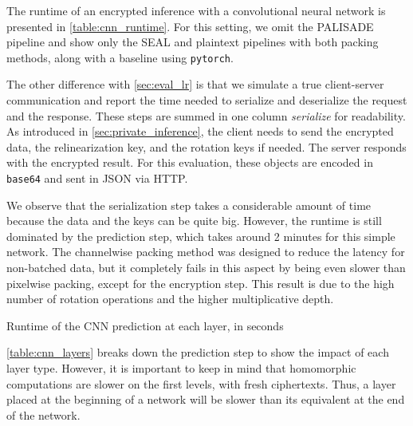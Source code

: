 \documentclass[a4paper,11pt,oneside]{report}
\begin{document}
The runtime of an encrypted inference with a convolutional neural network is presented in \autoref{table:cnn_runtime}. 
For this setting, we omit the PALISADE pipeline and show only the SEAL and plaintext pipelines with both packing methods, along with a baseline using \texttt{pytorch}.

The other difference with \autoref{sec:eval_lr} is that we simulate a true client-server communication and report the time needed to serialize and deserialize the request and the response.
These steps are summed in one column \emph{serialize} for readability.
As introduced in \autoref{sec:private_inference}, the client needs to send the encrypted data, the relinearization key, and the rotation keys if needed.
The server responds with the encrypted result.
For this evaluation, these objects are encoded in \texttt{base64} and sent in JSON via HTTP.

We observe that the serialization step takes a considerable amount of time because the data and the keys can be quite big. 
However, the runtime is still dominated by the prediction step, which takes around 2 minutes for this simple network.
The channelwise packing method was designed to reduce the latency for non-batched data, but it completely fails in this aspect by being even slower than pixelwise packing, except for the encryption step.
This result is due to the high number of rotation operations and the higher multiplicative depth.

\begin{table}[h!]
  \begin{center}
    \caption{Runtime of the CNN prediction at each layer, in seconds}
    \label{table:cnn_layers}
  \end{center}
\end{table}

\autoref{table:cnn_layers} breaks down the prediction step to show the impact of each layer type. 
However, it is important to keep in mind that homomorphic computations are slower on the first levels, with fresh ciphertexts. 
Thus, a layer placed at the beginning of a network will be slower than its equivalent at the end of the network.
\end{document}

